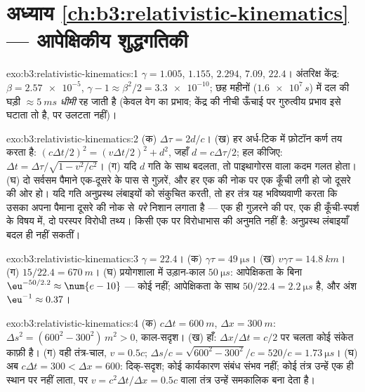 \section*{अध्याय \ref{ch:b3:relativistic-kinematics} --- आपेक्षिकीय शुद्धगतिकी}

\begin{solution}{exo:b3:relativistic-kinematics:1}
$\gamma = 1.005$, $1.155$, $2.294$, $7.09$, $22.4$। अंतरिक्ष केंद्र: $\beta =
\num{2.57e-5}$, $\gamma - 1 \approx \beta^2/2 = \num{3.3e-10}$;
छह महीनों ($\num{1.6e7}{}\,\unit{s}$) में दल की घड़ी
$\approx\qty{5}{ms}$ \emph{धीमी} रह जाती है (केवल वेग का प्रभाव;
केंद्र की नीची ऊँचाई पर गुरुत्वीय प्रभाव इसे घटाता तो है, पर उलटता
नहीं)।
\end{solution}

\begin{solution}{exo:b3:relativistic-kinematics:2}
(क) $\Delta\tau = 2d/c$। (ख) हर अर्ध-टिक में फ़ोटॉन कर्ण तय करता है:
$(c\Delta t/2)^2 = (v\Delta t/2)^2 + d^2$, जहाँ $d =
c\Delta\tau/2$; हल कीजिए: $\Delta t = \Delta\tau/\sqrt{1 - v^2/c^2}$। (ग)
यदि $d$ गति के साथ बदलता, तो पाइथागोरस वाला कदम गलत होता। (घ)
दो सर्वसम पैमाने एक-दूसरे के पास से गुज़रें, और हर एक की नोक पर एक
कूँची लगी हो जो दूसरे की ओर हो। यदि गति अनुप्रस्थ लंबाइयों को संकुचित
करती, तो हर तंत्र यह भविष्यवाणी करता कि उसका अपना पैमाना दूसरे की नोक
से \emph{परे} निशान लगाता है --- एक ही गुज़रने की  पर, एक ही
कूँची-स्पर्श के विषय में, दो परस्पर विरोधी तथ्य। किसी एक  पर
विरोधाभास की अनुमति नहीं है: अनुप्रस्थ लंबाइयाँ बदल ही नहीं सकतीं।
\end{solution}

\begin{solution}{exo:b3:relativistic-kinematics:3}
$\gamma = 22.4$। (क) $\gamma\tau = \qty{49}{\micro s}$। (ख) $v\gamma
\tau = \qty{14.8}{km}$। (ग) $15/22.4 = \qty{670}{m}$। (घ) प्रयोगशाला
में उड़ान-काल $\qty{50}{\micro s}$: आपेक्षिकता के बिना
$\eu^{-50/2.2} \approx \num{e-10}$ --- कोई नहीं; आपेक्षिकता के साथ
 $50/22.4 = \qty{2.2}{\micro s}$ है, और अंश $\eu^{-1}
\approx 0.37$।
\end{solution}

\begin{solution}{exo:b3:relativistic-kinematics:4}
(क) $c\Delta t = \qty{600}{m}$, $\Delta x = \qty{300}{m}$: $\Delta s^2
= (600^2 - 300^2)\,\unit{m^2} > 0$, काल-सदृश। (ख) हाँ:
$\Delta x/\Delta t = c/2$ पर चलता कोई संकेत काफ़ी है। (ग) वही तंत्र-चाल, $v =
0.5c$;  $\Delta s/c = \sqrt{600^2 - 300^2}/c = 520/c =
\qty{1.73}{\micro s}$। (घ) अब $c\Delta t = 300 < \Delta x = 600$:
दिक्-सदृश; कोई कार्यकारण संबंध संभव नहीं; कोई तंत्र उन्हें एक ही स्थान
पर नहीं लाता, पर $v = c^2\Delta t/\Delta x = 0.5c$ वाला तंत्र उन्हें
समकालिक बना देता है।
\end{solution}

